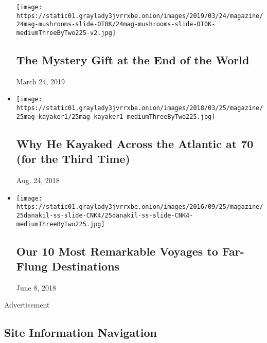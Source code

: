 \begin{itemize}
  \texttt{[image: https://static01.graylady3jvrrxbe.onion/images/2019/03/24/magazine/24mag-mushrooms-slide-OT0K/24mag-mushrooms-slide-OT0K-mediumThreeByTwo225-v2.jpg]}

  \hypertarget{the-mystery-gift-at-the-end-of-the-world}{%
  \subsection{The Mystery Gift at the End of the
  World}\label{the-mystery-gift-at-the-end-of-the-world}}

  March 24, 2019
\item
  \href{https://www.nytimes3xbfgragh.onion/interactive/2018/03/22/magazine/voyages-kayaking-across-ocean-at-70.html}{}

  \texttt{[image: https://static01.graylady3jvrrxbe.onion/images/2018/03/25/magazine/25mag-kayaker1/25mag-kayaker1-mediumThreeByTwo225.jpg]}

  \hypertarget{why-he-kayaked-across-the-atlantic-at-70-for-the-third-time}{%
  \subsection{Why He Kayaked Across the Atlantic at 70 (for the Third
  Time)}\label{why-he-kayaked-across-the-atlantic-at-70-for-the-third-time}}

  Aug. 24, 2018
\item
  \href{https://www.nytimes3xbfgragh.onion/2018/03/22/magazine/our-10-most-remarkable-voyages-to-far-flung-destinations.html}{}

  \texttt{[image: https://static01.graylady3jvrrxbe.onion/images/2016/09/25/magazine/25danakil-ss-slide-CNK4/25danakil-ss-slide-CNK4-mediumThreeByTwo225.jpg]}

  \hypertarget{our-10-most-remarkable-voyages-to-far-flung-destinations}{%
  \subsection{Our 10 Most Remarkable Voyages to Far-Flung
  Destinations}\label{our-10-most-remarkable-voyages-to-far-flung-destinations}}

  June 8, 2018
\end{itemize}

Advertisement

\hypertarget{site-information-navigation}{%
\subsection{Site Information
Navigation}\label{site-information-navigation}}


